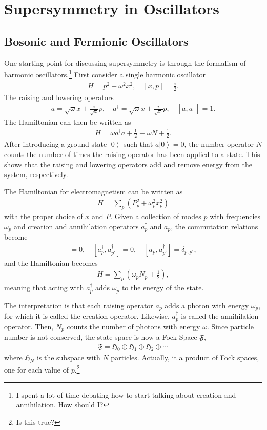 \documentclass[12pt]{article} %
\renewcommand{\th}[1]{\frac{1}{#1}}
\newcommand{\om}{\omega}
\newcommand{\ket}[1]{\left|#1\right\rangle}
\newcommand{\comm}[2]{\left[#1,#2\right]}
\begin{document}
\section{Supersymmetry in Oscillators}

\subsection{Bosonic and Fermionic Oscillators} \emph{}

One starting point for discussing supersymmetry is through the formalism of harmonic oscillators.\footnote{I spent a lot of time debating how to start talking about creation and annihilation. How should I?} First consider a single harmonic oscillator 
\begin{align}
H = p^2 +\om^2 x^2,\quad \comm{x}{p} = \frac{i}{2}. \label{eqn:harmosc}
\end{align}
The raising and lowering operators 
\begin{align}
a = \sqrt{\om}x+\frac{i}{\sqrt{\om}}p,\quad a^\dag = \sqrt{\om}x+\frac{i}{
	\sqrt{\om}}p,\quad \comm{a}{a^\dag } = 1.
\end{align}
The Hamiltonian can then be written as 
\begin{align}
H = \om a^\dag a + \th{2} \equiv \om N + \th{2}.
\end{align}
After introducing a ground state $\ket{0}$ such that $a\ket{0} = 0$, the number operator $N$ counts the number of times the raising operator has been applied to a state. This shows that the raising and lowering operators add and remove energy from the system, respectively. 

The Hamiltonian for electromagnetism can be written as
\begin{align}
H = \sum_p \left(P_p^2 + \om_p^2x_p^2\right)
\end{align}
with the proper choice of $x$ and $P$. Given a collection of modes $p$ with frequencies $\om_p$ and creation and annihilation operators $a_p^\dag$ and $a_p$, the commutation relations become 
\begin{align}
[a_p, a_{p'}] = 0,\quad [a^\dag_p, a^\dag_{p'}]=0, \quad[a_p,a^\dag_{p'}] = 
	\delta_{p,p'},
\end{align}
and the Hamiltonian becomes
\begin{align}
H = \sum_p\left(\om_pN_p+\th{2}\right),
\end{align}
meaning that acting with $a_p^\dag$ adds $\om_p$ to the energy of the state.

The interpretation is that each raising operator $a_p$ adds a photon with energy $\om_p$, for which it is called the creation operator. Likewise, $a_p^\dag$ is called the annihilation operator. Then, $N_p$ counts the number of photons with energy $\om$. Since particle number is not conserved, the state space is now a  Fock Space $\mathfrak{F}$,
\begin{align}
\mathfrak{F} = \mathfrak{H}_0 \oplus \mathfrak{H}_1 \oplus \mathfrak{H}_2 
\oplus \cdots
\end{align}
where $\mathfrak{H}_N$ is the subspace with $N$ particles. Actually, it a product of Fock spaces, one for each value of $p$.\footnote{Is this true?}
\end{document}
